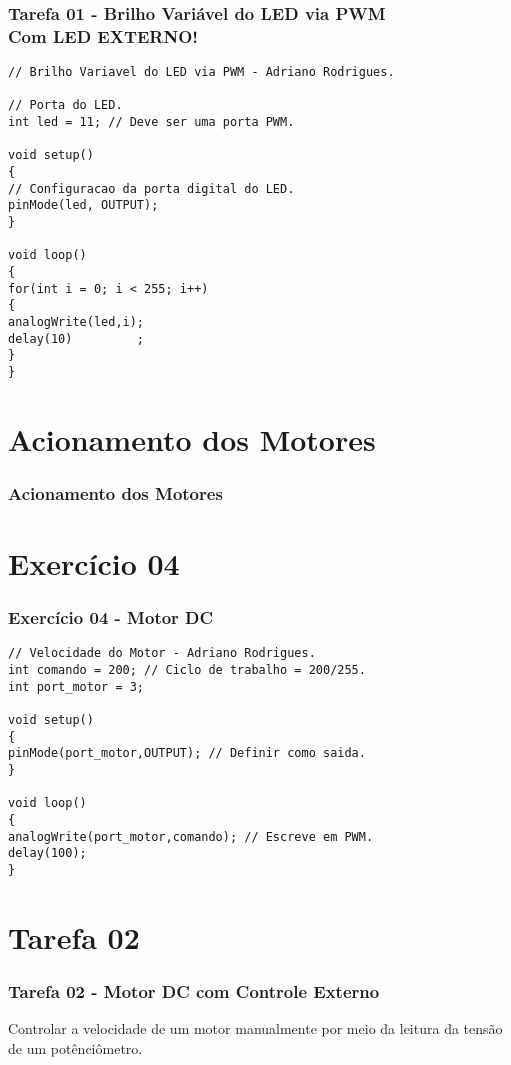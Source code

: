 \documentclass{beamer}
\begin{document}
\begin{frame}[fragile]
	\frametitle{Tarefa 01 - Brilho Variável do LED via PWM\\Com LED \textbf{EXTERNO}!}
	\begin{lstlisting}[style=Arduino,basicstyle=\scriptsize \ttfamily]
// Brilho Variavel do LED via PWM - Adriano Rodrigues.

// Porta do LED.
int led = 11; // Deve ser uma porta PWM.

void setup()
{
// Configuracao da porta digital do LED.
pinMode(led, OUTPUT);
}

void loop()
{
for(int i = 0; i < 255; i++)
{
analogWrite(led,i);
delay(10)         ;
}
}	\end{lstlisting}
\end{frame}

\section{Acionamento dos Motores}
\begin{frame}
	\frametitle{Acionamento dos Motores}
	\begin{center}
		 \hspace{15pt}
	\end{center}
\end{frame}

\section{Exercício 04}
\begin{frame}[fragile]
	\frametitle{Exercício 04 - Motor DC}
	\begin{lstlisting}[style=Arduino,basicstyle=\scriptsize \ttfamily]
// Velocidade do Motor - Adriano Rodrigues.
int comando = 200; // Ciclo de trabalho = 200/255.
int port_motor = 3;

void setup()
{
pinMode(port_motor,OUTPUT); // Definir como saida.
}

void loop()
{
analogWrite(port_motor,comando); // Escreve em PWM.
delay(100);
}	\end{lstlisting}
\end{frame}

\section{Tarefa 02}
\begin{frame}
	\frametitle{Tarefa 02 - Motor DC com Controle Externo}
	Controlar a velocidade de um motor manualmente por meio da leitura da tensão de um potênciômetro.
\end{frame}
\end{document}
